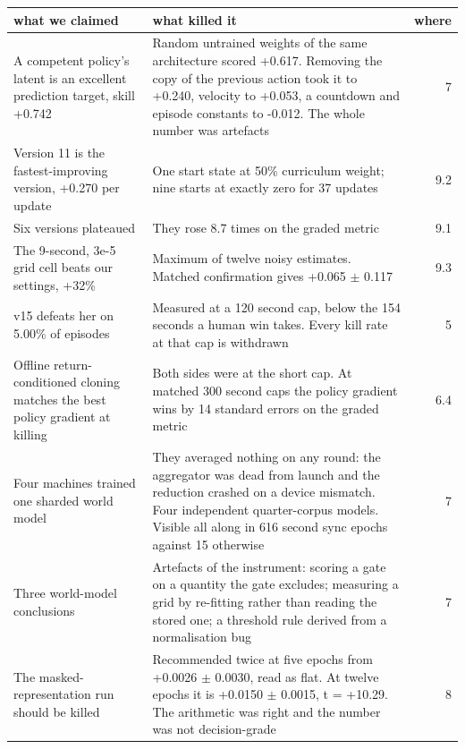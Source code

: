 \documentclass[11pt]{article}
\begin{document}
\begin{table}[!htbp]
  \centering
  \label{tab:everyclaimthisprojectpublish}
\begin{center}\small
\begin{tabularx}{\linewidth}{@{}XXr@{}}
\toprule
\textbf{what we claimed} & \textbf{what killed it} & \textbf{where} \\
\midrule
A competent policy's latent is an excellent prediction target, skill +0.742 & Random untrained weights of the same architecture scored +0.617. Removing the copy of the previous action took it to +0.240, velocity to +0.053, a countdown and episode constants to -0.012. The whole number was artefacts & 7 \\
Version 11 is the fastest-improving version, +0.270 per update & One start state at 50\% curriculum weight; nine starts at exactly zero for 37 updates & 9.2 \\
Six versions plateaued & They rose 8.7 times on the graded metric & 9.1 \\
The 9-second, 3e-5 grid cell beats our settings, +32\% & Maximum of twelve noisy estimates. Matched confirmation gives +0.065 $\pm$ 0.117 & 9.3 \\
v15 defeats her on 5.00\% of episodes & Measured at a 120 second cap, below the 154 seconds a human win takes. Every kill rate at that cap is withdrawn & 5 \\
Offline return-conditioned cloning matches the best policy gradient at killing & Both sides were at the short cap. At matched 300 second caps the policy gradient wins by 14 standard errors on the graded metric & 6.4 \\
Four machines trained one sharded world model & They averaged nothing on any round: the aggregator was dead from launch and the reduction crashed on a device mismatch. Four independent quarter-corpus models. Visible all along in 616 second sync epochs against 15 otherwise & 7 \\
Three world-model conclusions & Artefacts of the instrument: scoring a gate on a quantity the gate excludes; measuring a grid by re-fitting rather than reading the stored one; a threshold rule derived from a normalisation bug & 7 \\
The masked-representation run should be killed & Recommended twice at five epochs from +0.0026 $\pm$ 0.0030, read as flat. At twelve epochs it is +0.0150 $\pm$ 0.0015, t = +10.29. The arithmetic was right and the number was not decision-grade & 8 \\

\end{tabularx}
\end{center}
\end{table}
\end{document}
